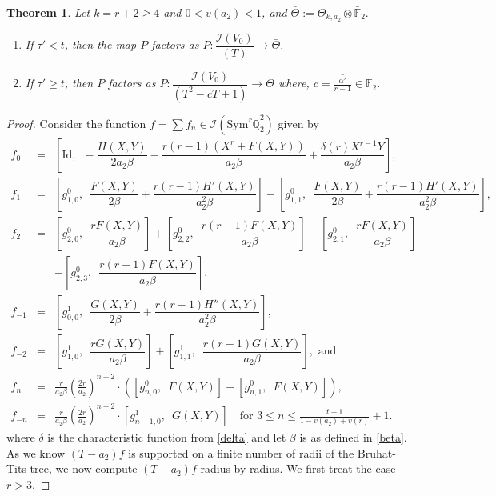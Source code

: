 \documentclass[11pt, reqno]{amsart}
\numberwithin{equation}{section}
\newcommand{\F}{\mathbb{F}}
\newcommand\Sym{{\mathrm {Sym}}}
\newtheorem{theorem}[thm]{Theorem}
\theoremstyle{definition}
\theoremstyle{remark}
\theoremstyle{definition}
\theoremstyle{remark}
\theoremstyle{remark}
\begin{document}
\begin{theorem}\label{irred}
Let $k=r+2\geq 4$ and $0<v(a_2)<1$, and $\bar{\Theta}:=\Theta_{k,a_2} \otimes \bar{\F}_{2}.$
\begin{enumerate}
    \item If $\tau'<t$, then the map $P$ factors as $P:\dfrac{\mathcal{I}(V_{0})}{(T)} \to \bar{\Theta}$. 
    \item If $\tau'\geq t$, then $P$ factors as $P:\dfrac{\mathcal{I}(V_0)}{\left(T^{2}-cT+1\right)}\to \bar{\Theta}$  where, $c=\overline{\frac{\alpha'}{r-1}} \in \bar{\F}_{2}.$ \end{enumerate} 
\end{theorem}
\begin{proof}
Consider the function $f=\sum f_n\in \mathcal{I}(\Sym^{r}\bar{\mathbb{{Q}}}^{2}_{2})$ given by
		\begin{eqnarray*}
			f_0	&=& \left[\mathrm{Id},\enspace -\dfrac{H(X,Y)}{2a_2\beta}-\dfrac{r(r-1)(X^r+F(X,Y))}{a_2\beta} + \dfrac{\delta(r)X^{r-1}Y}{a_2\beta}\right], \\[1ex]
			f_1 &=& \left[g_{1,0}^0,\enspace \dfrac{F(X,Y)}{2\beta}+\dfrac{r(r-1)H'(X,Y)}{a_{2}^2\beta}\right] -\left[g_{1,1}^0,\enspace \dfrac{F(X,Y)}{2\beta}+\dfrac{r(r-1)H'(X,Y)}{a_{2}^2\beta}\right],\\[1ex]
			f_2 &=& \left[g_{2,0}^0,\enspace \dfrac{rF(X,Y)}{a_2\beta}\right]+\left[g_{2,2}^0, \enspace \dfrac{r(r-1)F(X,Y)}{a_2\beta}\right]
			-\left[g_{2,1}^0,\enspace \dfrac{rF(X,Y)}{a_2\beta}\right]\\ & &-\left[g_{2,3}^0,\enspace \dfrac{r(r-1)F(X,Y)}{a_2\beta}\right],\\[1ex]
			f_{-1}& =& \left[g_{0,0}^1,\enspace \dfrac{G(X,Y)}{2\beta}+\dfrac{r(r-1)H''(X,Y)}{a_2^2\beta}\right], 
			\\[1ex]
			f_{-2}& =& \left[g_{1,0}^1,\enspace \dfrac{rG(X,Y)}{a_{2}\beta}\right]+ \left[g_{1,1}^1,\enspace \dfrac{r(r-1)G(X,Y)}{a_2\beta}\right], \text{ and }\\[1ex]
		  f_n &=&
            \frac{r}{a_2\beta}
            \left(\frac{2r}{a_2}\right)^{n-2}\cdot\left(\left[g_{n,0}^0,\enspace F(X,Y)\right]-\left[g_{n,1}^0, \enspace F(X,Y)\right]\right),\\
		f_{-n}&=& \frac{r}{a_2\beta}
            \left(\frac{2r}{a_2}\right)^{n-2}\cdot\left[g_{n-1,0}^1,\enspace G(X,Y)\right]\quad\text{for  }  3 \leq n \leq \frac{t+1}{1-v(a_{2})+v(r)}+1.
		\end{eqnarray*}
  where $\delta$ is the characteristic function from \eqref{delta} and let $\beta$ is as defined in \eqref{beta}. As we know $\left(T-a_{2}\right)f$ is supported on a finite number of radii of the Bruhat-Tits tree, we now compute $\left(T-a_{2}\right)f$ radius by radius. We first treat the case $r>3$.
  

\end{proof}
\end{document}
